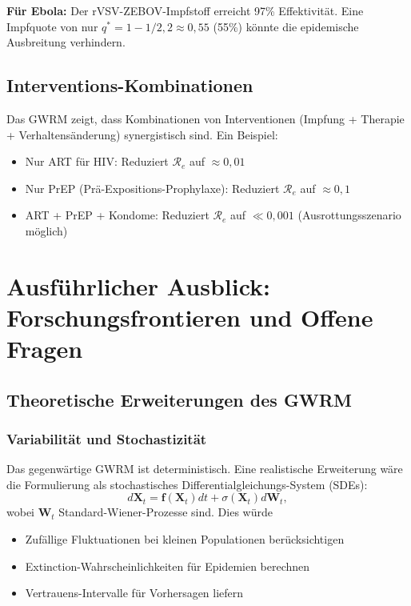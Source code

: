 ﻿\documentclass[a4paper,12pt]{article}
\theoremstyle{definition}
\begin{document}
\textbf{Für Ebola:} Der rVSV-ZEBOV-Impfstoff erreicht 97\% Effektivität. Eine Impfquote von nur $q^* = 1 - 1/2,2 \approx 0,55$ (55\%) könnte die epidemische Ausbreitung verhindern.

\subsection{Interventions-Kombinationen}

Das GWRM zeigt, dass Kombinationen von Interventionen (Impfung + Therapie + Verhaltensänderung) synergistisch sind. Ein Beispiel:
\begin{itemize}
\item Nur ART für HIV: Reduziert $\mathcal{R}_e$ auf $\approx 0,01$
\item Nur PrEP (Prä-Expositions-Prophylaxe): Reduziert $\mathcal{R}_e$ auf $\approx 0,1$
\item ART + PrEP + Kondome: Reduziert $\mathcal{R}_e$ auf $\ll 0,001$ (Ausrottungsszenario möglich)
\end{itemize}

\section{Ausführlicher Ausblick: Forschungsfrontieren und Offene Fragen}

\subsection{Theoretische Erweiterungen des GWRM}

\subsubsection{Variabilität und Stochastizität}
Das gegenwärtige GWRM ist deterministisch. Eine realistische Erweiterung wäre die Formulierung als stochastisches Differentialgleichungs-System (SDEs):
\[
d\mathbf{X}_t = \mathbf{f}(\mathbf{X}_t) dt + \sigma(\mathbf{X}_t) d\mathbf{W}_t,
\]
wobei $\mathbf{W}_t$ Standard-Wiener-Prozesse sind. Dies würde
\begin{itemize}
\item Zufällige Fluktuationen bei kleinen Populationen berücksichtigen
\item Extinction-Wahrscheinlichkeiten für Epidemien berechnen
\item Vertrauens-Intervalle für Vorhersagen liefern
\end{itemize}
\end{document}
